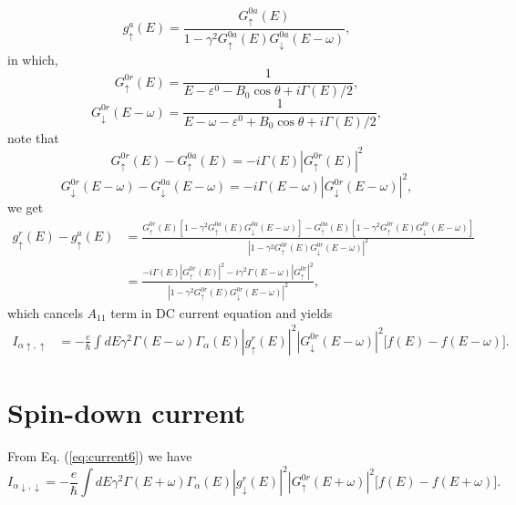 \documentclass[11pt,a4paper]{article}
\begin{document}
\begin{equation}
g_{\uparrow}^{a}(E) = \frac{ G_{\uparrow}^{0a}(E)} {1-\gamma^{2} G_{\uparrow}^{0a}(E) G_{\downarrow}^{0a}(E-\omega)},
\end{equation}
in which,
\begin{equation}
G_{\uparrow}^{0 r}(E)=\frac{1}{E-\varepsilon^{0}-B_{0} \cos \theta+i \Gamma(E) / 2},
\end{equation}
\begin{equation}
G_{\downarrow}^{0 r}(E-\omega)=\frac{1}{E-\omega-\varepsilon^{0}+B_{0} \cos \theta+i \Gamma(E) / 2},
\end{equation}
note that
\begin{equation}
G_{\uparrow}^{0 r}(E) - G_{\uparrow}^{0 a}(E)=-i\Gamma(E) |G_{\uparrow}^{0 r}(E)|^{2}
\end{equation}
\begin{equation}
G_{\downarrow}^{0 r}(E-\omega) - G_{\downarrow}^{0 a}(E-\omega)=-i\Gamma(E-\omega) |G_{\downarrow}^{0 r}(E-\omega)|^{2},
\end{equation}
we get
\begin{equation}
\begin{split}
g_{\uparrow}^{r}(E) - g_{\uparrow}^{a}(E) &= \frac{G_{\uparrow}^{0r}(E)[1-\gamma^{2} G_{\uparrow}^{0a}(E) G_{\downarrow}^{0a}(E-\omega)]- G_{\uparrow}^{0a}(E)[1-\gamma^{2} G_{\uparrow}^{0r}(E) G_{\downarrow}^{0r}(E-\omega)]} {|1-\gamma^{2} G_{\uparrow}^{0r}(E) G_{\downarrow}^{0r}(E-\omega)|^{2}} \\
&=\frac{-i\Gamma(E) |G_{\uparrow}^{0 r}(E)|^{2}-i\gamma^{2}\Gamma(E-\omega) |G_{\uparrow}^{0r}|^{2}} {|1-\gamma^{2} G_{\uparrow}^{0r}(E) G_{\downarrow}^{0r}(E-\omega)|^{2}},
\end{split}
\end{equation}
which cancels $A_{11}$ term in DC current equation and yields
\begin{equation}
\begin{split}
I_{\alpha\uparrow,\uparrow}&=-\frac{e}{\hbar}\int dE \gamma^{2}\Gamma(E-\omega) \Gamma_{\alpha}(E)|g_{\uparrow}^{r}\left(E\right)|^{2} |G_{\downarrow}^{0r} (E-\omega)|^{2} \big[f(E) - f(E-\omega) \big].
\end{split}
\label{eq:current6}
\end{equation}
\section{Spin-down current}
From Eq. (\ref{eq:current6}) we have
\begin{equation}
I_{\alpha\downarrow,\downarrow}= -\frac{e}{\hbar}\int dE \gamma^{2}\Gamma(E+\omega) \Gamma_{\alpha}(E)|g_{\downarrow}^{r}\left(E\right)|^{2} |G_{\uparrow}^{0r} (E+\omega)|^{2} \big[f(E) - f(E+\omega) \big].
\label{eq:current7}
\end{equation}
\end{document}
